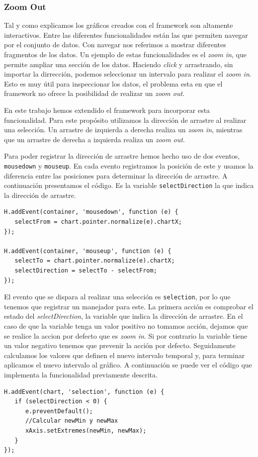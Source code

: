 		\subsubsection{Zoom Out}
			Tal y como explicamos los gráficos creados con el framework son altamente interactivos. Entre las diferentes funcionalidades
			están las que permiten navegar por el conjunto de datos. Con navegar nos referimos a mostrar diferentes fragmentos de los
			datos. Un ejemplo de estas funcionalidades es el \emph{zoom in}, que permite ampliar una sección de los datos. Haciendo \emph{click}
			y arrastrando, sin importar la dirrección, podemos seleccionar un intervalo para realizar el \emph{zoom in}. Esto es muy útil para
			inspeccionar los datos, el problema esta en que el framework no ofrece la posibilidad de realizar un \emph{zoom out}.
			\par
			En este trabajo hemos extendido el framework para incorporar esta funcionalidad. Para este propósito utilizamos la dirección
			de arrastre al realizar una selección. Un arrastre de izquierda a derecha realiza un \emph{zoom in}, mientras que un arrastre de
			derecha a izquierda realiza un \emph{zoom out}. 
			\par
			Para poder registrar la dirección de arrastre hemos hecho uso de dos eventos, \texttt{mousedown} y \texttt{mouseup}. En cada
			evento registramos la posición de este y usamos la diferencia entre las posiciones para determinar la dirección de arrastre. A
			continuación presentamos el código. Es la variable \texttt{selectDirection} la que indica la dirección de arrastre.
			\begin{lstlisting}[style=myJs]
H.addEvent(container, 'mousedown', function (e) {
   selectFrom = chart.pointer.normalize(e).chartX;
});

H.addEvent(container, 'mouseup', function (e) {
   selectTo = chart.pointer.normalize(e).chartX;
   selectDirection = selectTo - selectFrom;													            
});
			\end{lstlisting}
			\par
			El evento que se dispara al realizar una selección es \texttt{selection}, por lo que tenemos que registrar un manejador para
			este. La primera acción es comprobar el estado del \emph{selectDirection}, la variable que indica la dirección de arrastre. En
			el caso de que la variable tenga un valor positivo no tomamos acción, dejamos que se realice la accion por defecto que es
			\emph{zoom in}. Si por contrario la variable tiene un valor negativo tenemos que prevenir la acción por defecto. Seguidamente
			calculamos los valores que definen el nuevo intervalo temporal y, para terminar aplicamos el nuevo intervalo al gráfico. A
			continuación se puede ver el código que implementa la funcionalidad previamente descrita.
			\begin{lstlisting}[style=myJs]
H.addEvent(chart, 'selection', function (e) {
   if (selectDirection < 0) {
      e.preventDefault();
      //Calcular newMin y newMax
      xAxis.setExtremes(newMin, newMax);
   }
});
			\end{lstlisting}
